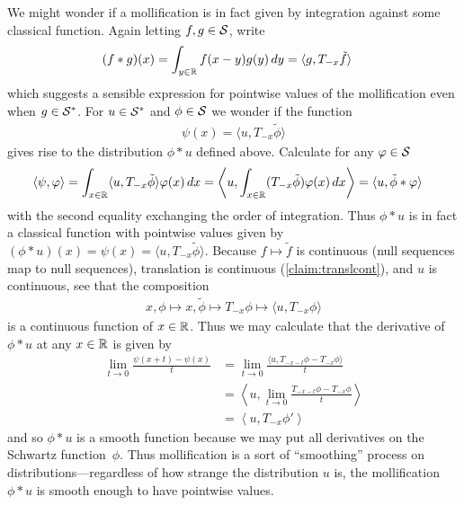    We might wonder if a mollification is in fact given by integration against some classical function.
    Again letting $f,g\in\S$, write
    \begin{align*}
      (f*g)(x)
      &= \int_{y\in\R} f(x-y)g(y)\,dy
      = \langle g, T_{-x}\tilde f\rangle
    \end{align*}
    which suggests a sensible expression for pointwise values of the mollification even when $g\in\SS$.
    For $u\in\SS$ and $\phi\in\S$ we wonder if the function
    \begin{align*}
      \psi(x) = \langle u, T_{-x}\tilde\phi\rangle
    \end{align*}
    gives rise to the distribution $\phi*u$ defined above.
    Calculate for any $\varphi\in\S$
    \begin{align*}
      \left\langle \psi, \varphi \right\rangle
      &= \int_{x\in\R} \langle u,T_{-x}\tilde\phi\rangle\varphi(x)\,dx
      = \left\langle u, \int_{x\in\R} (T_{-x}\tilde\phi)\varphi(x)\,dx \right\rangle
      = \langle u, \tilde\phi*\varphi\rangle
    \end{align*}
    with the second equality exchanging the order of integration.
    Thus $\phi*u$ is in fact a classical function with pointwise values given by $(\phi*u)(x)=\psi(x)=\langle u, T_{-x}\tilde\phi\rangle$.
    Because $f\mapsto\tilde f$ is continuous (null sequences map to null sequences), translation is continuous (\cref{claim:translcont}), and $u$ is continuous, see that the composition
    \begin{align*}
      x, \phi \mapsto x, \tilde\phi \mapsto T_{-x}\phi \mapsto \langle u, T_{-x}\phi \rangle
    \end{align*}
    is a continuous function of $x\in\R$.
    Thus we may calculate that the derivative of $\phi*u$ at any $x\in\R$ is given by
    \begin{align*}
      \lim_{t\rightarrow0} \frac{\psi(x+t) - \psi(x)}{t}
      &= \lim_{t\rightarrow0} \frac{\langle u, T_{-x-t}\phi-T_{-x}\phi\rangle}{t}
      \\&= \left\langle u, \lim_{t\rightarrow0} \frac{T_{-x-t}\phi-T_{-x}\phi}{t}\right\rangle
      \\&= \left\langle u, T_{-x}\phi'\right\rangle
    \end{align*}
    and so $\phi*u$ is a smooth function because we may put all derivatives on the Schwartz function~$\phi$.
    Thus mollification is a sort of ``smoothing'' process on distributions---regardless of how strange the distribution $u$ is, the mollification $\phi*u$ is smooth enough to have pointwise values.

